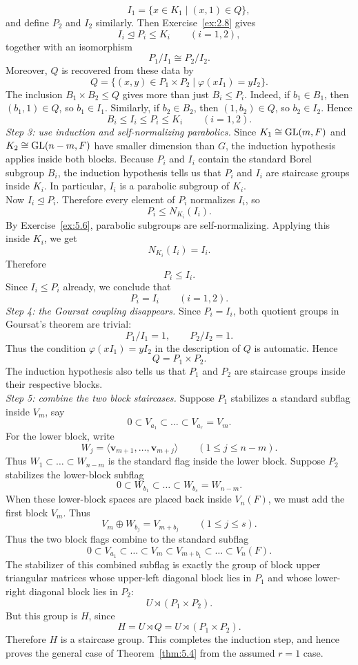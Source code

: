 \documentclass[../Odyssey_Project.tex]{subfiles}
\begin{document}
\begin{solution}
\[    \qquad
    I_1=\{x\in K_1\mid (x,1)\in Q\},
\]
and define $P_2$ and $I_2$ similarly. Then Exercise~\ref{ex:2.8} gives
\[
    I_i\trianglelefteq P_i\leq K_i
    \qquad
    (i=1,2),
\]
together with an isomorphism
\[
    P_1/I_1\cong P_2/I_2.
\]
Moreover, $Q$ is recovered from these data by
\[
    Q=\{(x,y)\in P_1\times P_2\mid \varphi(xI_1)=yI_2\}.
\]
The inclusion $B_1\times B_2\leq Q$ gives more than just $B_i\leq P_i$. Indeed, if $b_1\in B_1$, then $(b_1,1)\in Q$, so $b_1\in I_1$. Similarly, if $b_2\in B_2$, then $(1,b_2)\in Q$, so $b_2\in I_2$. Hence
\[
    B_i\leq I_i\leq P_i\leq K_i
    \qquad
    (i=1,2).
\]
\textit{Step 3: use induction and self-normalizing parabolics.} Since $K_1\cong \operatorname{GL}(m,F)$ and $K_2\cong \operatorname{GL}(n-m,F)$ have smaller dimension than $G$, the induction hypothesis applies inside both blocks. Because $P_i$ and $I_i$ contain the standard Borel subgroup $B_i$, the induction hypothesis tells us that $P_i$ and $I_i$ are staircase groups inside $K_i$. In particular, $I_i$ is a parabolic subgroup of $K_i$.\\
Now $I_i\trianglelefteq P_i$. Therefore every element of $P_i$ normalizes $I_i$, so
\[
    P_i\leq N_{K_i}(I_i).
\]
By Exercise~\ref{ex:5.6}, parabolic subgroups are self-normalizing. Applying this inside $K_i$, we get
\[
    N_{K_i}(I_i)=I_i.
\]
Therefore
\[
    P_i\leq I_i.
\]
Since $I_i\leq P_i$ already, we conclude that
\[
    P_i=I_i
    \qquad
    (i=1,2).
\]
\textit{Step 4: the Goursat coupling disappears.} Since $P_i=I_i$, both quotient groups in Goursat's theorem are trivial:
\[
    P_1/I_1=1,
    \qquad
    P_2/I_2=1.
\]
Thus the condition $\varphi(xI_1)=yI_2$ in the description of $Q$ is automatic. Hence
\[
    Q=P_1\times P_2.
\]
The induction hypothesis also tells us that $P_1$ and $P_2$ are staircase groups inside their respective blocks.\\
\textit{Step 5: combine the two block staircases.} Suppose $P_1$ stabilizes a standard subflag inside $V_m$, say
\[
    0\subset V_{a_1}\subset \dots\subset V_{a_r}=V_m.
\]
For the lower block, write
\[
    W_j=\langle \mathbf{v}_{m+1},\dots,\mathbf{v}_{m+j}\rangle
    \qquad
    (1\leq j\leq n-m).
\]
Thus $W_1\subset \dots\subset W_{n-m}$ is the standard flag inside the lower block. Suppose $P_2$ stabilizes the lower-block subflag
\[
    0\subset W_{b_1}\subset \dots\subset W_{b_s}=W_{n-m}.
\]
When these lower-block spaces are placed back inside $V_n(F)$, we must add the first block $V_m$. Thus
\[
    V_m\oplus W_{b_j}=V_{m+b_j}
    \qquad
    (1\leq j\leq s).
\]
Thus the two block flags combine to the standard subflag
\[
    0\subset V_{a_1}\subset \dots\subset V_m
      \subset V_{m+b_1}\subset \dots\subset V_n(F).
\]
The stabilizer of this combined subflag is exactly the group of block upper triangular matrices whose upper-left diagonal block lies in $P_1$ and whose lower-right diagonal block lies in $P_2$:
\[
    U\rtimes(P_1\times P_2).
\]
But this group is $H$, since
\[
    H=U\rtimes Q=U\rtimes(P_1\times P_2).
\]
Therefore $H$ is a staircase group. This completes the induction step, and hence proves the general case of Theorem~\ref{thm:5.4} from the assumed $r=1$ case.
\end{solution}
\end{document}
